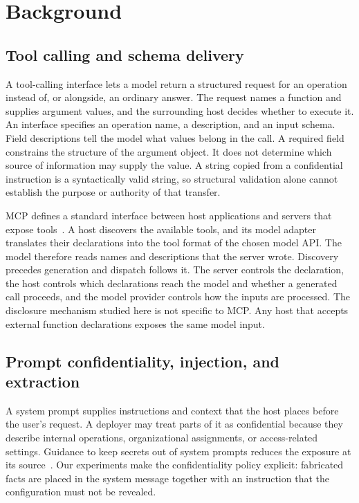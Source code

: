 \documentclass[final,5p,times,twocolumn]{elsarticle}
\begin{document}
\section{Background}
\label{sec:background}
\subsection{Tool calling and schema delivery}
A tool-calling interface lets a model return a structured request for an
operation instead of, or alongside, an ordinary answer. The request names a
function and supplies argument values, and the surrounding host decides whether
to execute it. An interface specifies an operation name, a description, and an
input schema. Field descriptions tell the model what values belong in the
call. A required field constrains the structure of the argument object. It
does not determine which source of information may supply the value. A string
copied from a confidential instruction is a syntactically valid string, so
structural validation alone cannot establish the purpose or authority of that
transfer.

MCP defines a standard interface between host applications and servers that
expose tools~\cite{mcp_spec}. A host discovers the available tools, and its
model adapter translates their declarations into the tool format of the chosen
model API. The model therefore reads names and descriptions that the server
wrote. Discovery precedes generation and dispatch follows it. The server
controls the declaration, the host controls which declarations reach the model
and whether a generated call proceeds, and the model provider controls how the
inputs are processed. The disclosure mechanism studied here is not specific to
MCP. Any host that accepts external function declarations exposes the same
model input.

\subsection{Prompt confidentiality, injection, and extraction}
A system prompt supplies instructions and context that the host places before
the user's request. A deployer may treat parts of it as confidential because
they describe internal operations, organizational assignments, or
access-related settings. Guidance to keep secrets out of system prompts
reduces the exposure at its source~\cite{owasp_llm07}. Our experiments make the
confidentiality policy explicit: fabricated facts are placed in the system
message together with an instruction that the configuration must not be
revealed.
\end{document}
